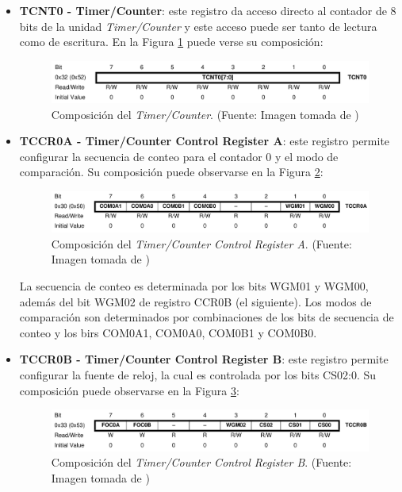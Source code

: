 \begin{itemize}
    \item \textbf{TCNT0 - Timer/Counter}: este registro da acceso directo al contador de 8 bits de la unidad \textit{Timer/Counter} y este acceso puede ser tanto de lectura como de escritura. En la Figura \ref{fig:TCNT0} puede verse su composición: 

    \begin{figure}[H]
    \centering
    \includegraphics[width=150mm]{./Figuras/Nota_teorica/TCNT0}
    \caption{Composición del \textit{Timer/Counter}. (Fuente: Imagen tomada de \cite{AT})}
    \label{fig:TCNT0}
    \end{figure}

    \item \textbf{TCCR0A - Timer/Counter Control Register A}: este registro permite configurar la secuencia de conteo para el contador 0 y el modo de comparación. Su composición puede observarse en la Figura \ref{fig:TCCR0A}: 

    \begin{figure}[H]
    \centering
    \includegraphics[width=150mm]{./Figuras/Nota_teorica/TCCR0A}
    \caption{Composición del \textit{Timer/Counter Control Register A}. (Fuente: Imagen tomada de \cite{AT})}
    \label{fig:TCCR0A}
    \end{figure}

    La secuencia de conteo es determinada por los bits WGM01 y WGM00, además del bit WGM02 de registro CCR0B (el siguiente). Los modos de comparación son determinados por combinaciones de los bits de secuencia de conteo y los birs COM0A1, COM0A0, COM0B1 y COM0B0. 

    
    \item \textbf{TCCR0B - Timer/Counter Control Register B}: este registro permite configurar la fuente de reloj, la cual es controlada por los bits CS02:0. Su composición puede observarse en la Figura \ref{fig:TCCR0B}: 
    
    \begin{figure}[H]
    \centering
    \includegraphics[width=150mm]{./Figuras/Nota_teorica/TCCR0B}
    \caption{Composición del \textit{Timer/Counter Control Register B}. (Fuente: Imagen tomada de \cite{AT})}
    \label{fig:TCCR0B}
    \end{figure}


\end{itemize}

